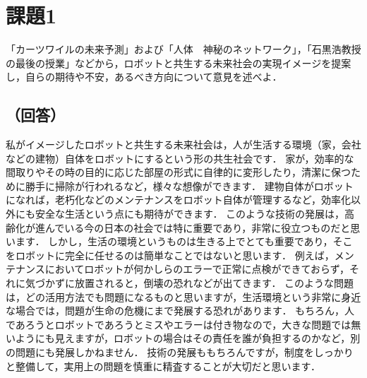 \section*{課題1}
「カーツワイルの未来予測」および「人体　神秘のネットワーク」，「石黒浩教授の最後の授業」などから，ロボットと共生する未来社会の実現イメージを提案し，自らの期待や不安，あるべき方向について意見を述べよ．

\subsection*{（回答）}
私がイメージしたロボットと共生する未来社会は，人が生活する環境（家，会社などの建物）自体をロボットにするという形の共生社会です．
家が，効率的な間取りやその時の目的に応じた部屋の形式に自律的に変形したり，清潔に保つために勝手に掃除が行われるなど，様々な想像ができます．
建物自体がロボットになれば，老朽化などのメンテナンスをロボット自体が管理するなど，効率化以外にも安全な生活という点にも期待ができます．
このような技術の発展は，高齢化が進んでいる今の日本の社会では特に重要であり，非常に役立つものだと思います．
しかし，生活の環境というものは生きる上でとても重要であり，そこをロボットに完全に任せるのは簡単なことではないと思います．
例えば，メンテナンスにおいてロボットが何かしらのエラーで正常に点検ができておらず，それに気づかずに放置されると，倒壊の恐れなどが出てきます．
このような問題は，どの活用方法でも問題になるものと思いますが，生活環境という非常に身近な場合では，問題が生命の危機にまで発展する恐れがあります．
もちろん，人であろうとロボットであろうとミスやエラーは付き物なので，大きな問題では無いようにも見えますが，ロボットの場合はその責任を誰が負担するのかなど，別の問題にも発展しかねません．
技術の発展ももちろんですが，制度をしっかりと整備して，実用上の問題を慎重に精査することが大切だと思います．
